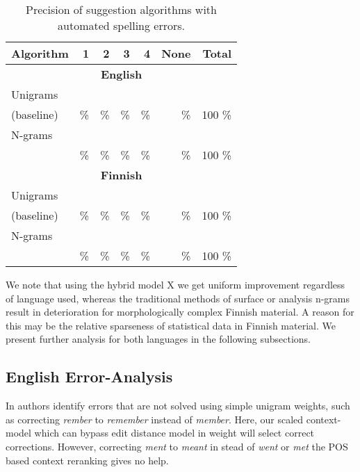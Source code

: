 \documentclass{llncs}
\begin{document}
\begin{table*}
    \caption{Precision of suggestion algorithms with automated spelling errors.
    \label{table:fake-eval}}
  \begin{center}
      \begin{tabular}{lrrrrrr}
        \hline
        Algorithm & 1 & 2 & 3 & 4 & None & Total \\
        \hline
        \multicolumn{7}{c}{\textbf{English}} \\
        \hline
        Unigrams
 &     &       &      &      &        &     \\
        (baseline)
 &  \% &    \% &   \% &   \% &    \%  & 100 \% \\
        \hline
        N-grams
&       &      &      &      &       &     \\
&    \% &   \% &   \% &   \% &    \% & 100 \% \\
        \hline
        \multicolumn{7}{c}{\textbf{Finnish}} \\
        \hline
        Unigrams
   &     &       &      &      &       &     \\
        (baseline)
 &  \% &    \% &   \% &   \% &    \% & 100 \% \\
        \hline
        N-grams 
&       &      &      &      &       &     \\
 &    \% &   \% &   \% &   \% &    \% & 100 \% \\
        \hline
      \end{tabular}
  \end{center}
\end{table*}

We note that using the hybrid model X we get uniform improvement regardless
of language used, whereas the traditional methods of surface or analysis n-grams
result in deterioration for morphologically complex Finnish material. A reason
for this may be the relative sparseness of statistical data in Finnish
material. We present further analysis for both languages in the following 
subsections.

\subsection{English Error-Analysis}

In \cite{norvig/2010} authors identify errors that are not solved using simple
unigram weights, such as correcting \emph{rember} to \emph{remember} instead of
\emph{member}. Here, our scaled context-model which can bypass edit distance
model in weight will select correct corrections. However, correcting
\emph{ment} to \emph{meant} in stead of \emph{went} or \emph{met} the POS
based context reranking gives no help.
 
\end{document}
